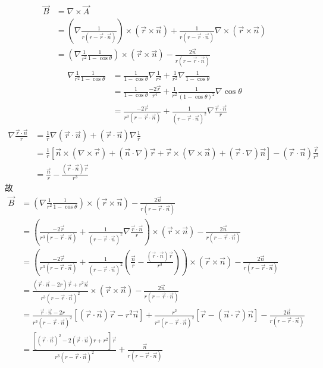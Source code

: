 \documentclass{phyasgn}
\begin{document}
\begin{sol}[4]
  \begin{align*}
    \vec{B}&=\nabla\times\vec{A}\\
    &=(\nabla\frac{1}{r(r-\vec{r}\cdot\vec{n})})\times(\vec{r}\times\vec{n})+\frac{1}{r(r-\vec{r}\cdot\vec{n})}\nabla\times(\vec{r}\times\vec{n})\\
    &=(\nabla\frac{1}{r^2}\frac{1}{1-\cos\theta})\times(\vec{r}\times\vec{n})-\frac{2\vec{n}}{r(r-\vec{r}\cdot\vec{n})}
  \end{align*}
  \begin{align*}
    \nabla\frac{1}{r^2}\frac{1}{1-\cos\theta}&=\frac{1}{1-\cos\theta}\nabla\frac{1}{r^2}+\frac{1}{r^2}\nabla\frac{1}{1-\cos\theta}\\
    &=\frac{1}{1-\cos\theta}\frac{-2\vec{r}}{r^4}+\frac{1}{r^2}\frac{1}{(1-\cos\theta)^2}\nabla\cos\theta\\
    &=\frac{-2\vec{r}}{r^3(r-\vec{r}\cdot\vec{n})}+\frac{1}{(r-\vec{r}\cdot\vec{n})^2}\nabla\frac{\vec{r}\cdot\vec{n}}{r}
  \end{align*}
  \begin{align*}
    \nabla\frac{\vec{r}\cdot\vec{n}}{r}&=\frac{1}{r}\nabla(\vec{r}\cdot\vec{n})+(\vec{r}\cdot\vec{n})\nabla\frac{1}{r}\\
    &=\frac{1}{r}[\vec{n}\times(\nabla\times\vec{r})+(\vec{n}\cdot\nabla)\vec{r}+\vec{r}\times(\nabla\times\vec{n})+(\vec{r}\cdot\nabla)\vec{n}]-(\vec{r}\cdot\vec{n})\frac{\vec{r}}{r^3}\\
    &=\frac{\vec{n}}{r}-\frac{(\vec{r}\cdot\vec{n})\vec{r}}{r^3}
  \end{align*}
  故
  \begin{align*}
    \vec{B}&=(\nabla\frac{1}{r^2}\frac{1}{1-\cos\theta})\times(\vec{r}\times\vec{n})-\frac{2\vec{n}}{r(r-\vec{r}\cdot\vec{n})}\\
    &=(\frac{-2\vec{r}}{r^3(r-\vec{r}\cdot\vec{n})}+\frac{1}{(r-\vec{r}\cdot\vec{n})^2}\nabla\frac{\vec{r}\cdot\vec{n}}{r})\times(\vec{r}\times\vec{n})-\frac{2\vec{n}}{r(r-\vec{r}\cdot\vec{n})}\\
    &=(\frac{-2\vec{r}}{r^3(r-\vec{r}\cdot\vec{n})}+\frac{1}{(r-\vec{r}\cdot\vec{n})^2}(\frac{\vec{n}}{r}-\frac{(\vec{r}\cdot\vec{n})\vec{r}}{r^3}))\times(\vec{r}\times\vec{n})-\frac{2\vec{n}}{r(r-\vec{r}\cdot\vec{n})}\\
    &=\frac{(\vec{r}\cdot\vec{n}-2r)\vec{r}+r^2\vec{n}}{r^3(r-\vec{r}\cdot\vec{n})^2}\times(\vec{r}\times\vec{n})-\frac{2\vec{n}}{r(r-\vec{r}\cdot\vec{n})}\\
    &=\frac{\vec{r}\cdot\vec{n}-2r}{r^3(r-\vec{r}\cdot\vec{n})^2}[(\vec{r}\cdot\vec{n})\vec{r}-r^2\vec{n}]+\frac{r^2}{r^3(r-\vec{r}\cdot\vec{n})^2}[\vec{r}-(\vec{n}\cdot\vec{r})\vec{n}]-\frac{2\vec{n}}{r(r-\vec{r}\cdot\vec{n})}\\
    &=\frac{[(\vec{r}\cdot\vec{n})^2-2(\vec{r}\cdot\vec{n})r+r^2]\vec{r}}{r^3(r-\vec{r}\cdot\vec{n})^2}+\frac{\vec{n}}{r(r-\vec{r}\cdot\vec{n})}
  \end{align*}
\end{sol}\par
\end{document}
